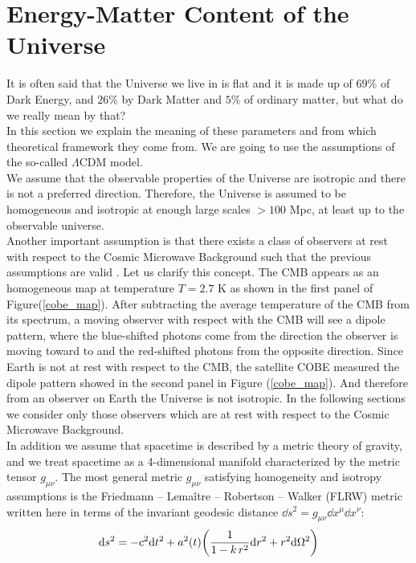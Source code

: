 \documentclass{article}
\begin{document}
\newpage


\section{Energy-Matter Content of the Universe} 
It is often said that the Universe we live in is flat and it is made up of $69$\% of Dark Energy, and $26 $\% by Dark Matter and $5$\% of ordinary matter, but what do we really mean by that?\\
In this section we explain the meaning of these parameters and from which theoretical framework they come from. 
We are going to use the assumptions of the so-called $\Lambda$CDM model.\\
We assume that the observable properties of the Universe are isotropic and there is not a preferred direction. 
Therefore, the Universe is assumed to be homogeneous and isotropic at enough large scales $> 100$ Mpc, at least up to the observable universe.\\
Another important assumption is that there exists a class of observers at rest with respect to the Cosmic Microwave Background such that the previous assumptions are valid \citep{bartelmannStandardModelCosmology}.
Let us clarify this concept.
The CMB appears as an homogeneous map at temperature $T=2.7$ K as shown in the first panel of Figure(\ref{cobe_map}).
After subtracting the average temperature of the CMB from its spectrum, a moving observer with respect with the CMB will see a dipole pattern, where the blue-shifted photons come from the direction the observer is moving toward to and the red-shifted photons from the opposite direction.
Since Earth is not at rest with respect to the CMB, the satellite COBE measured the dipole pattern showed in the second panel in Figure (\ref{cobe_map}).
And therefore from an observer on Earth the Universe is not isotropic.
In the following sections we consider only those observers which are at rest with respect to the Cosmic Microwave Background.\\
In addition we assume that spacetime is described by a metric theory of gravity, and we treat spacetime as a 4-dimensional manifold characterized by the metric tensor $g_{\mu \nu}$.
The most general metric $g_{\mu \nu}$ satisfying homogeneity and isotropy assumptions is the Friedmann – Lemaître – Robertson – Walker (FLRW) metric written here in terms of the invariant geodesic distance $\dd s ^2 = g_{\mu \nu} \dd x^{\mu} \dd x^{\nu}$:
\begin{equation}
\label{metric}
\dd s ^2 = -c ^2 \dd t^2 + a^2 (t) \qty( \frac{1}{1-k \, r^2} \dd r^2 + r^2 \dd \Omega ^2 )  
\end{equation}
\end{document}
